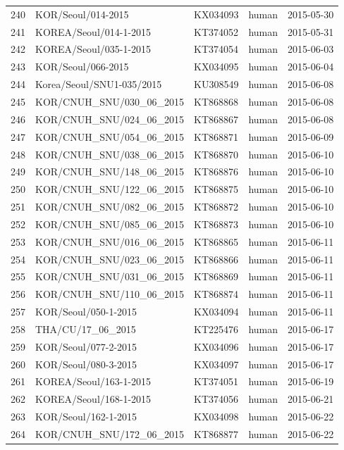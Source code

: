 \documentclass[9pt,lineno]{elife}
\begin{document}
\begin{longtable}{ | r | l | p{2cm} | l | l | }
  240 & KOR/Seoul/014-2015 & KX034093 & human & 2015-05-30 \\
  241 & KOREA/Seoul/014-1-2015 & KT374052 & human & 2015-05-31 \\
  242 & KOREA/Seoul/035-1-2015 & KT374054 & human & 2015-06-03 \\
  243 & KOR/Seoul/066-2015 & KX034095 & human & 2015-06-04 \\
  244 & Korea/Seoul/SNU1-035/2015 & KU308549 & human & 2015-06-08 \\
  245 & KOR/CNUH\_SNU/030\_06\_2015 & KT868868 & human & 2015-06-08 \\
  246 & KOR/CNUH\_SNU/024\_06\_2015 & KT868867 & human & 2015-06-08 \\
  247 & KOR/CNUH\_SNU/054\_06\_2015 & KT868871 & human & 2015-06-09 \\
  248 & KOR/CNUH\_SNU/038\_06\_2015 & KT868870 & human & 2015-06-10 \\
  249 & KOR/CNUH\_SNU/148\_06\_2015 & KT868876 & human & 2015-06-10 \\
  250 & KOR/CNUH\_SNU/122\_06\_2015 & KT868875 & human & 2015-06-10 \\
  251 & KOR/CNUH\_SNU/082\_06\_2015 & KT868872 & human & 2015-06-10 \\
  252 & KOR/CNUH\_SNU/085\_06\_2015 & KT868873 & human & 2015-06-10 \\
  253 & KOR/CNUH\_SNU/016\_06\_2015 & KT868865 & human & 2015-06-11 \\
  254 & KOR/CNUH\_SNU/023\_06\_2015 & KT868866 & human & 2015-06-11 \\
  255 & KOR/CNUH\_SNU/031\_06\_2015 & KT868869 & human & 2015-06-11 \\
  256 & KOR/CNUH\_SNU/110\_06\_2015 & KT868874 & human & 2015-06-11 \\
  257 & KOR/Seoul/050-1-2015 & KX034094 & human & 2015-06-11 \\
  258 & THA/CU/17\_06\_2015 & KT225476 & human & 2015-06-17 \\
  259 & KOR/Seoul/077-2-2015 & KX034096 & human & 2015-06-17 \\
  260 & KOR/Seoul/080-3-2015 & KX034097 & human & 2015-06-17 \\
  261 & KOREA/Seoul/163-1-2015 & KT374051 & human & 2015-06-19 \\
  262 & KOREA/Seoul/168-1-2015 & KT374056 & human & 2015-06-21 \\
  263 & KOR/Seoul/162-1-2015 & KX034098 & human & 2015-06-22 \\
  264 & KOR/CNUH\_SNU/172\_06\_2015 & KT868877 & human & 2015-06-22 \\

\end{longtable}
\end{document}
